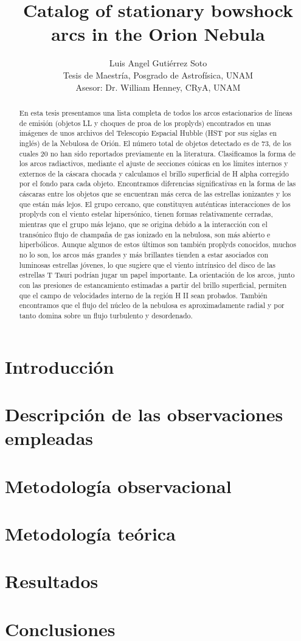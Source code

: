 \documentclass{report}
\title{Catalog of stationary bowshock arcs in the Orion Nebula}
\author{
  Luis Angel Gutiérrez Soto\\
  Tesis de Maestría, Posgrado de Astrofísica, UNAM\\
  Asesor: Dr. William Henney, CRyA, UNAM
}
\begin{document}
\maketitle

\tableofcontents

\begin{abstract}
 En esta tesis presentamos una lista completa de todos los arcos estacionarios de líneas de emisión (objetos LL y choques de proa de los proplyds) encontrados en unas imágenes de unos archivos del Telescopio Espacial Hubble (HST por sus siglas en inglés) de la Nebulosa de Orión. El número total de objetos detectado es de 73, de los cuales 20 no han sido reportados previamente en la literatura. Clasificamos la forma de los arcos radiactivos, mediante el ajuste de secciones cónicas en los límites internos y externos de la cáscara chocada y calculamos el brillo superficial de H alpha corregido por el fondo para cada objeto. Encontramos diferencias significativas en la forma de las cáscaras entre los objetos que se encuentran más cerca de las estrellas ionizantes y los que están más lejos. El grupo cercano, que constituyen auténticas interacciones de los proplyds con el viento estelar hipersónico, tienen formas relativamente cerradas, mientras que el grupo más lejano, que se origina debido a la interacción con el transónico flujo de champaña de gas ionizado en la nebulosa, son más abierto e hiperbólicos. Aunque algunos de estos últimos son también proplyds conocidos, muchos no lo son, los arcos más grandes y más brillantes tienden a estar asociados con luminosas estrellas jóvenes, lo que sugiere que el viento intrínsico del disco de las estrellas T Tauri podrían  jugar un papel importante. La orientación de los arcos, junto con las presiones de estancamiento estimadas a partir del brillo superficial, permiten que el campo de velocidades interno de la región H II sean probados. También  encontramos que el flujo  del núcleo de la nebulosa es aproximadamente radial y por tanto domina sobre un flujo turbulento y desordenado.
\end{abstract}


\chapter{Introducción}

\chapter{Descripción de las observaciones empleadas}

\chapter{Metodología observacional}

\chapter{Metodología teórica}

\chapter{Resultados}

\chapter{Conclusiones}



\end{document}
